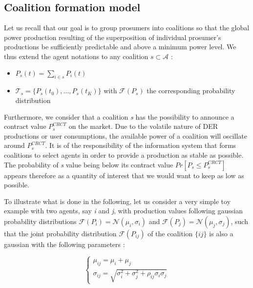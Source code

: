 \documentclass[conference]{IEEEtran}
\begin{document}
\subsection{Coalition formation model}\label{subsec:Coalition}

Let us recall that our goal is to group prosumers into coalitions so that the global power production resulting of the superposition of individual prosumer's productions be sufficiently predictable and above a minimum power level. We thus extend the agent notations to any coalition $ s \subset \mathcal{A} $ : 
\begin{itemize}
\item $ P_{s}(t) = \sum_{i \in s} P_{i}(t) $
\item $ \mathcal{T}_{s} = \{ P_{s}(t_{0}),...,P_{s}(t_{K}) \} $ with $ \mathcal{F}(P_{s}) $ the corresponding probability distribution
\end{itemize}

Furthermore, we consider that a coalition \textit{s} has the possibility to announce a contract value $ P_{s}^{CRCT} $ on the market. Due to the volatile nature of DER productions or user consumptions, the available power of a coalition will oscillate around $ P_{s}^{CRCT} $. It is of the responsibility of the information system that forms coalitions to select agents in order to provide a production as stable as possible. The probability of \textit{s} value being below its contract value $ Pr[P_{s} \leq P_{s}^{CRCT} ] $ appears therefore as a quantity of interest that we would want to keep as low as possible. 

To illustrate what is done in the following, let us consider a very simple toy example with two agents, say \textit{i} and \textit{j}, with production values following gaussian probability distributions $ \mathcal{F}(P_{i}) = \mathcal{N}(\mu_{i}, \sigma_{i}) $ and $ \mathcal{F}(P_{j}) = \mathcal{N}(\mu_{j}, \sigma_{j}) $, such that the joint probability distribution  $ \mathcal{F}(P_{ij}) $ of the coalition $\{ij\}$ is also a gaussian with the following parameters :

\begin{equation}
\left\{ \begin{array}{lll}
		\mu_{ij} = \mu_{i} + \mu_{j} \\
		\sigma_{ij} = \sqrt{\sigma_{i}^{2} + \sigma_{j}^{2} + \rho_{ij}\sigma_{i}\sigma_{j}}
\end{array} \right.
\label{parameters}
\end{equation}
\end{document}
